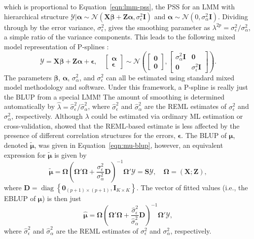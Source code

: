 \documentclass[cmfont,usenames,dvipsnames,leqno]{afit-etd}\usepackage[]{graphicx}\usepackage[]{color}
\newcommand{\bc}[1]{\ensuremath{\bm{\mathcal{#1}}}}
\newcommand{\mc}[1]{\ensuremath{\mathcal{#1}}}
\newcommand{\wh}[1]{\ensuremath{\widehat{#1}}}
\newcommand{\wt}[1]{\ensuremath{\widetilde{#1}}}
\newcommand{\diag}{\operatorname{diag}}
\begin{document}
which is proportional to Equation~\eqref{eqn:lmm-pss}, the PSS for an LMM with hierarchical structure $\bc{Y}|\bm{\alpha} \sim \mc{N}(\bm{X}\bm{\beta} + \bm{Z}\bm{\alpha}, \sigma_\epsilon^2\bm{I})$ and $\bm{\alpha} \sim \mc{N}(0, \sigma_\alpha^2\bm{I})$. Dividing through by the error variance, $\sigma_\epsilon^2$, gives the smoothing parameter as $\lambda^{2p} = \sigma_\epsilon^2/\sigma_\alpha^2$, a simple ratio of the variance components. This leads to the following mixed model representation of P-splines \citep{brumback_comment_1999}:
\begin{equation}
\label{eqn:pspline-lmm}
  \bc{Y} = \bm{X}\bm{\beta} + \bm{Z}\bm{\alpha} + \bm{\epsilon}, \quad 
  \begin{bmatrix} 
    \bm{\alpha} \\
    \bm{\epsilon}
  \end{bmatrix} \sim 
    \mc{N}\left(\begin{bmatrix} 
      \bm{0} \\
      \bm{0}
    \end{bmatrix}, \begin{bmatrix} 
    \sigma_\alpha^2\bm{I} & \bm{0} \\
    \bm{0} & \sigma_\epsilon^2\bm{I}
  \end{bmatrix}\right).
\end{equation}
The parameters $\bm{\beta}$, $\bm{\alpha}$, $\sigma_\alpha^2$, and $\sigma_\epsilon^2$ can all be estimated using standard mixed model methodology and software. Under this framework, a P-spline is really just the BLUP from a special LMM! The amount of smoothing is determined automatically by $\wh{\lambda} = \wh{\sigma}_\epsilon^2/\wh{\sigma}_\alpha^2$, where $\wh{\sigma}_\epsilon^2$ and $\wh{\sigma}_\alpha^2$ are the REML estimates of $\sigma_\epsilon^2$ and $\sigma_\alpha^2$, respectively. Although $\lambda$ could be estimated via ordinary ML estimation or cross-validation, \citet{krivobokova_note_2007} showed that the REML-based estimate is less affected by the presence of different correlation structures for the errors, $\bm{\epsilon}$. The BLUP of $\bm{\mu}$, denoted $\wt{\bm{\mu}}$, was given in Equation~\eqref{eqn:mu-blup}, however, an equivalent expression for $\wt{\bm{\mu}}$ is given by
\begin{equation*}
  \wt{\bm{\mu}} = \bm{\Omega}\left( \bm{\Omega}'\bm{\Omega} + \frac{\sigma_\epsilon^2}{\sigma_\alpha^2}\bm{D} \right)^{-1}\bm{\Omega}'\bc{Y} = \bm{S}\bc{Y}, \quad \bm{\Omega} = \left(\bm{X}; \bm{Z}\right),
\end{equation*}
where $\textbf{D} = \diag\left\{\bm{0}_{(p+1) \times (p+1)}, \bm{I}_{K \times K}\right\}$. The vector of fitted values (i.e., the EBLUP of $\bm{\mu}$) is then just
\begin{equation*}
  \wh{\bm{\mu}} = \bm{\Omega}\left( \bm{\Omega}'\bm{\Omega} + \frac{\wh{\sigma}_\epsilon^2}{\wh{\sigma}_\alpha^2}\bm{D} \right)^{-1}\bm{\Omega}'\bc{Y},
\end{equation*}
where $\wh{\sigma}_\epsilon^2$ and $\wh{\sigma}_\alpha^2$ are the REML estimates of $\sigma_\epsilon^2$ and $\sigma_\alpha^2$, respectively.
\end{document}
